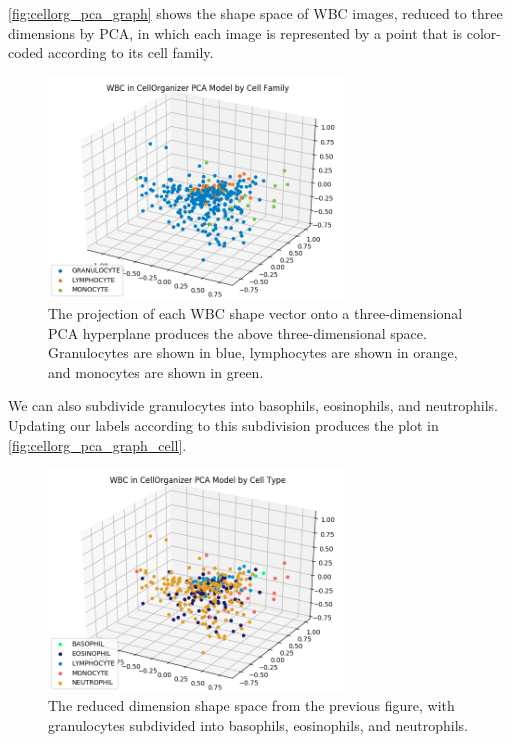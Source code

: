 \autoref{fig:cellorg_pca_graph} shows the shape space of WBC images, reduced to three dimensions by PCA, in which each image is represented by a point that is color-coded according to its cell family.\\

\begin{figure}[h]
\centering
\mySfFamily
\includegraphics[width = 0.7\textwidth]{../images/cellorg_pca_graph.png}
\caption{The projection of each WBC shape vector onto a three-dimensional PCA hyperplane produces the above three-dimensional space. Granulocytes are shown in blue, lymphocytes are shown in orange, and monocytes are shown in green.}
\label{fig:cellorg_pca_graph}
\end{figure}

We can also subdivide granulocytes into basophils, eosinophils, and neutrophils. Updating our labels according to this subdivision produces the plot in \autoref{fig:cellorg_pca_graph_cell}.

\begin{figure}[h]
\centering
\mySfFamily
\includegraphics[width = 0.7\textwidth]{../images/cellorg_pca_graph_cell.png}
\caption{The reduced dimension shape space from the previous figure, with granulocytes subdivided into basophils, eosinophils, and neutrophils.}
\label{fig:cellorg_pca_graph_cell}
\end{figure}

